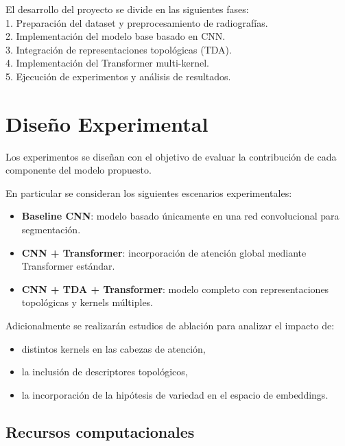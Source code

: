 \documentclass[conference]{IEEEtran}
\begin{document}
El desarrollo del proyecto se divide en las siguientes fases:\\

1. Preparación del dataset y preprocesamiento de radiografías.\\
2. Implementación del modelo base basado en CNN.\\
3. Integración de representaciones topológicas (TDA).\\
4. Implementación del Transformer multi-kernel.\\
5. Ejecución de experimentos y análisis de resultados.\\

\section{Diseño Experimental}

Los experimentos se diseñan con el objetivo de evaluar la contribución
de cada componente del modelo propuesto.

En particular se consideran los siguientes escenarios experimentales:

\begin{itemize}

\item \textbf{Baseline CNN}: modelo basado únicamente en una red
convolucional para segmentación.

\item \textbf{CNN + Transformer}: incorporación de atención global
mediante Transformer estándar.

\item \textbf{CNN + TDA + Transformer}: modelo completo con
representaciones topológicas y kernels múltiples.

\end{itemize}

Adicionalmente se realizarán estudios de ablación para analizar
el impacto de:

\begin{itemize}

\item distintos kernels en las cabezas de atención,
\item la inclusión de descriptores topológicos,
\item la incorporación de la hipótesis de variedad en el espacio de embeddings.
\end{itemize}

\subsection{Recursos computacionales}
\end{document}
